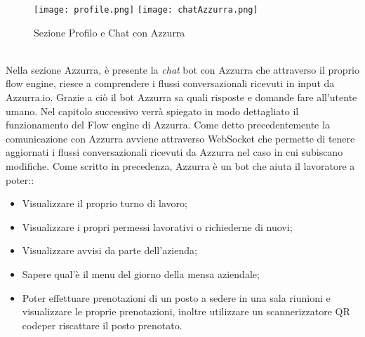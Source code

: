 \begin{trivlist}
	\begin{figure}[h]
		\begin{center}
			\texttt{[image: profile.png]}\hfil
			\texttt{[image: chatAzzurra.png]}
			\caption{Sezione Profilo e Chat con Azzurra}\label{fig:profile}
		\end{center}
	\end{figure}\\
	Nella sezione Azzurra, è presente la \emph{chat} \gls{bot}\ap{[g]} con Azzurra che attraverso il proprio flow engine, riesce a comprendere i flussi conversazionali ricevuti in input da Azzurra.io. Grazie a ciò il \gls{bot}\ap{[g]} Azzurra sa quali risposte e domande fare all'utente umano. Nel capitolo successivo verrà spiegato in modo dettagliato il funzionamento del Flow engine di Azzurra. Come detto precedentemente la comunicazione con Azzurra avviene attraverso \gls{WebSocket}\ap{[g]} che permette di tenere aggiornati i flussi conversazionali ricevuti da Azzurra nel caso in cui subiscano modifiche. Come scritto in precedenza, Azzurra è un \gls{bot}\ap{[g]} che aiuta il lavoratore a poter::
	\begin{itemize}
		\item Visualizzare il proprio turno di lavoro;
		\item Visualizzare i propri permessi lavorativi o richiederne di nuovi;
		\item Visualizzare avvisi da parte dell'azienda;
		\item Sapere qual'è il menu del giorno della mensa aziendale;
		\item Poter effettuare prenotazioni di un posto a sedere in una sala riunioni e visualizzare le proprie prenotazioni, inoltre utilizzare un scannerizzatore \gls{QR code}\glsfirstoccur per riscattare il posto prenotato.
	\end{itemize}
\end{trivlist}	
